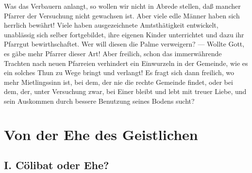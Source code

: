 Was das Verbauern anlangt, so wollen wir nicht in Abrede stellen, daß mancher Pfarrer der Versuchung nicht gewachsen ist. Aber viele edle Männer haben sich herrlich bewährt! Viele haben ausgezeichnete Amtsthätigkeit entwickelt, unablässig sich selber fortgebildet, ihre eigenen Kinder unterrichtet und dazu ihr Pfarrgut bewirthschaftet. Wer will diesen die Palme verweigern? — Wollte Gott, es gäbe mehr Pfarrer dieser Art! Aber freilich,
schon das immerwährende Trachten nach neuen Pfarreien verhindert ein Einwurzeln in der Gemeinde, wie es ein solches Thun zu Wege bringt und verlangt! Es fragt sich dann freilich, wo mehr Mietlingssinn ist, bei dem, der nie die rechte Gemeinde findet, oder bei dem, der, unter Versuchung zwar, bei Einer bleibt und lebt mit treuer Liebe, und sein Auskommen durch bessere Benutzung seines Bodens sucht?


\chapter{Von der Ehe des Geistlichen}


\section{I. Cölibat oder Ehe?}

